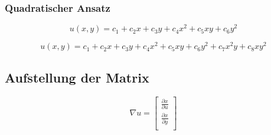 \subsubsection{Quadratischer Ansatz
\label{fem:subsection:bonorum}}

\begin{equation}
	u(x,y) = c_1 + c_2 x + c_3 y + c_4 x^2 + c_5 xy + c_6 y^2
	\label{fem:equationSchwarzquadratischD}
\end{equation}

\begin{equation}
	u(x,y) = c_1 + c_2 x + c_3 y + c_4 x^2 + c_5 xy + c_6 y^2 + c_7 x^2y + c_8 xy^2
	\label{fem:equationSchwarzquadratischP}
\end{equation} 

\subsection{Aufstellung der Matrix
\label{fem:subsection:goon}}

\begin{equation}
	\nabla u = 	
	\left[ \begin{array}{r}
	\frac{\partial x}{\partial u}  \\
	\frac{\partial x}{\partial y}   \\
	\end{array}\right]
	\label{fem:equationSchwarzquadratischP}
\end{equation} 


